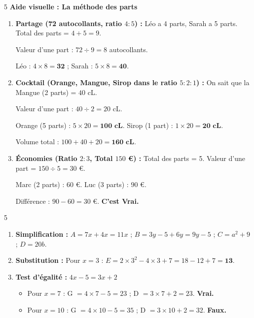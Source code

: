 \documentclass[a4paper]{book}
\begin{document}
{    \begin{exerciceNote}{5}
        \textbf{Aide visuelle : La méthode des parts}
        
        \begin{enumerate}
            \item \textbf{Partage (72 autocollants, ratio $4:5$) :}
            Léo a 4 parts, Sarah a 5 parts. Total des parts = $4 + 5 = 9$.
            
            Valeur d'une part : $72 \div 9 = 8$ autocollants.
            
            Léo : $4 \times 8 = \mathbf{32}$ ; Sarah : $5 \times 8 = \mathbf{40}$.
            
            \item \textbf{Cocktail (Orange, Mangue, Sirop dans le ratio $5:2:1$) :}
            On sait que la Mangue (2 parts) = $40$ cL.
            
            Valeur d'une part : $40 \div 2 = 20$ cL.
            
            Orange (5 parts) : $5 \times 20 = \mathbf{100 \text{ cL}}$.
            Sirop (1 part) : $1 \times 20 = \mathbf{20 \text{ cL}}$.
            
            Volume total : $100 + 40 + 20 = \mathbf{160 \text{ cL}}$.
            
            \item \textbf{Économies (Ratio $2:3$, Total $150$ \euro) :}
            Total des parts = 5. Valeur d'une part = $150 \div 5 = 30$ \euro.
            
            Marc (2 parts) : $60$ \euro. Luc (3 parts) : $90$ \euro.
            
            Différence : $90 - 60 = 30$ \euro. \textbf{C'est Vrai.}
        \end{enumerate}
    \end{exerciceNote}
    
    \begin{exerciceNote}{5}
        \begin{enumerate}
            \item \textbf{Simplification :} $A = 7x + 4x = 11x$ ; $B = 3y - 5 + 6y = 9y - 5$ ; $C = a^2 + 9$ ; $D = 20b$.
            \item \textbf{Substitution :} Pour $x=3$ : $E = 2 \times 3^2 - 4 \times 3 + 7 = 18 - 12 + 7 = \mathbf{13}$.
            \item \textbf{Test d'égalité :} $4x - 5 = 3x + 2$
            \begin{itemize}
                \item Pour $x=7$ : G $= 4 \times 7 - 5 = 23$ ; D $= 3 \times 7 + 2 = 23$. \textbf{Vrai.}
                \item Pour $x=10$ : G $= 4 \times 10 - 5 = 35$ ; D $= 3 \times 10 + 2 = 32$. \textbf{Faux.}
            \end{itemize}
        \end{enumerate}
    \end{exerciceNote}
    
}
\end{document}
